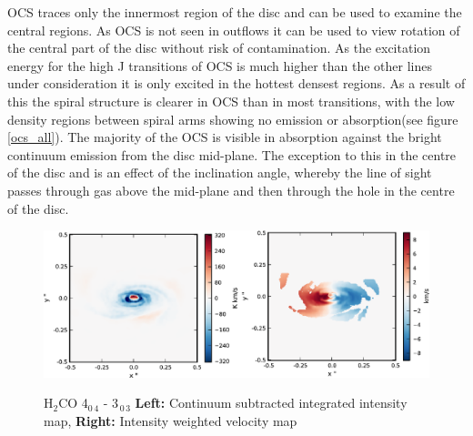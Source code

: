\documentclass[useAMS,usenatbib]{mn2e}
\begin{document}


OCS traces only the innermost region of the disc and can be used to examine the central regions. As OCS is not seen in outflows it can be used to view rotation of the central part of the disc without risk of contamination. As the excitation energy for the high J transitions of OCS is much higher than the other lines under consideration it is only excited in the hottest densest regions. As a result of this the spiral structure is clearer in OCS than in most transitions, with the low density regions between spiral arms showing no emission or absorption(see figure \ref{ocs_all}). The majority of the OCS is visible in absorption against the bright continuum emission from the disc mid-plane. The exception to this in the centre of the disc and is an effect of the inclination angle, whereby the line of sight passes through gas above the mid-plane and then through the hole in the centre of the disc. 

 
%


\begin{figure}
 \includegraphics[width=168mm]{Figures/sim/imageH2CO_4-0-4--3-0-3_30deg_composite_all.eps}
 \label{h2co_all}
 \caption{H$_2$CO 4$_{0\,4}$ - 3$_{\,0\,3}$ {\bf Left:} Continuum subtracted integrated intensity map, {\bf Right:} Intensity weighted velocity map}
\end{figure}
\end{document}
